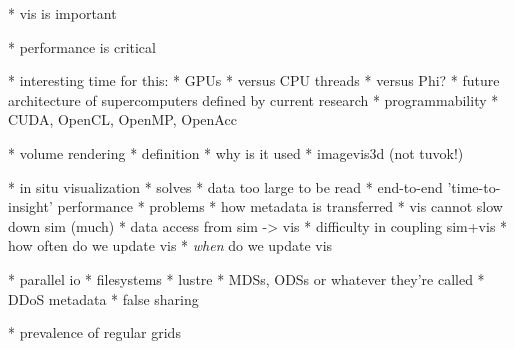 * vis is important

* performance is critical

* interesting time for this:
	* GPUs
	* versus CPU threads
	* versus Phi?
	* future architecture of supercomputers defined by current research
	* programmability
	* CUDA, OpenCL, OpenMP, OpenAcc

* volume rendering
	* definition
	* why is it used
	* imagevis3d (not tuvok!)

* in situ visualization
	* solves
		* data too large to be read
		* end-to-end 'time-to-insight' performance
	* problems
		* how metadata is transferred
		* vis cannot slow down sim (much)
		* data access from sim -> vis
		* difficulty in coupling sim+vis
		* how often do we update vis
		* \emph{when} do we update vis

* parallel io
	* filesystems
	* lustre
	* MDSs, ODSs or whatever they're called
	* DDoS metadata
	* false sharing

* prevalence of regular grids

